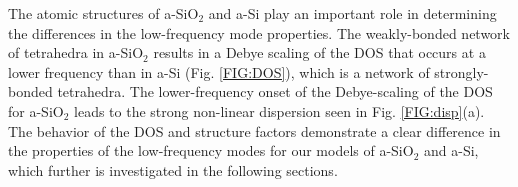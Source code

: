 \documentclass[aps,prb,onecolumn,preprint,superscriptaddress,footinbib,amsmath,amssymb,floatfix]{revtex4}
\begin{document}
The atomic structures of a-SiO$_2$ and a-Si play an important role 
in determining the differences in the low-frequency mode properties. 
The weakly-bonded network of tetrahedra in a-SiO$_2$
\cite{van_Beest_force_1990,kramer_interatomic_1991,
guissani_numerical_1996,mcgaughey_thermal_2004} results in a Debye 
scaling of the DOS that occurs at a lower frequency than in a-Si 
(Fig. \ref{FIG:DOS}), 
which is a network of strongly-bonded tetrahedra.
\cite{stillinger_computer_1985,biswas_vibrational_1988,
allen_diffusons_1999,barkema_high-quality_2000} 
The lower-frequency onset of the Debye-scaling of the DOS 
for a-SiO$_2$ leads to the strong non-linear dispersion 
seen in Fig. \ref{FIG:disp}(a). The behavior of the DOS and 
structure factors demonstrate a clear difference in the properties 
of the low-frequency modes for our models of a-SiO$_2$ and a-Si, which 
further is investigated in the following sections. 
\end{document}
